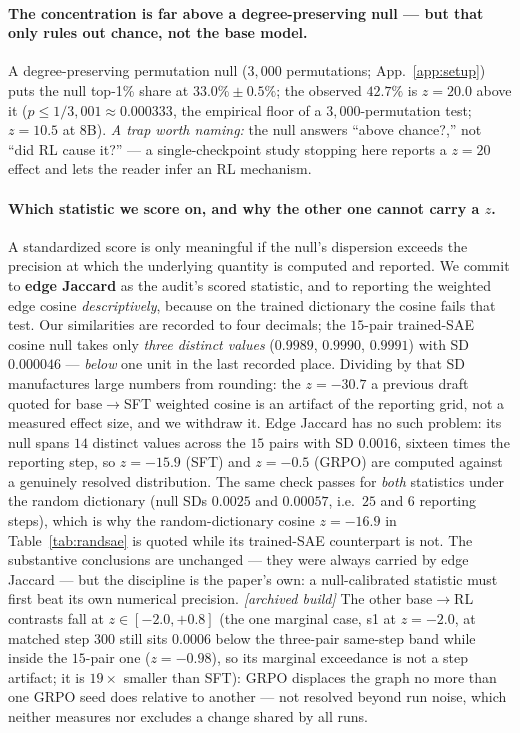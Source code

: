 \documentclass{article}
\begin{document}
\paragraph{The concentration is far above a degree-preserving null --- but that only rules out chance, not the base model.} A degree-preserving permutation null ($3{,}000$ permutations; App.~\ref{app:setup}) puts the null top-1\% share at $33.0\%\pm0.5\%$; the observed $42.7\%$ is $z=20.0$ above it ($p\le1/3{,}001\approx0.000333$, the empirical floor of a $3{,}000$-permutation test; $z=10.5$ at 8B). \emph{A trap worth naming:} the null answers ``above chance?,'' not ``did RL cause it?'' --- a single-checkpoint study stopping here reports a $z=20$ effect and lets the reader infer an RL mechanism.

\paragraph{Which statistic we score on, and why the other one cannot carry a $z$.} A standardized score is only meaningful if the null's dispersion exceeds the precision at which the underlying quantity is computed and reported. We commit to \textbf{edge Jaccard} as the audit's scored statistic, and to reporting the weighted edge cosine \emph{descriptively}, because on the trained dictionary the cosine fails that test. Our similarities are recorded to four decimals; the $15$-pair trained-SAE cosine null takes only \emph{three distinct values} ($0.9989$, $0.9990$, $0.9991$) with SD $0.000046$ --- \emph{below} one unit in the last recorded place. Dividing by that SD manufactures large numbers from rounding: the $z=-30.7$ a previous draft quoted for base$\to$SFT weighted cosine is an artifact of the reporting grid, not a measured effect size, and we withdraw it. Edge Jaccard has no such problem: its null spans $14$ distinct values across the $15$ pairs with SD $0.0016$, sixteen times the reporting step, so $z=-15.9$ (SFT) and $z=-0.5$ (GRPO) are computed against a genuinely resolved distribution. The same check passes for \emph{both} statistics under the random dictionary (null SDs $0.0025$ and $0.00057$, i.e.\ $25$ and $6$ reporting steps), which is why the random-dictionary cosine $z=-16.9$ in Table~\ref{tab:randsae} is quoted while its trained-SAE counterpart is not. The substantive conclusions are unchanged --- they were always carried by edge Jaccard --- but the discipline is the paper's own: a null-calibrated statistic must first beat its own numerical precision. \emph{[archived build]} The other base$\to$RL contrasts fall at $z\in[-2.0,+0.8]$ (the one marginal case, s1 at $z=-2.0$, at matched step $300$ still sits $0.0006$ below the three-pair same-step band while inside the $15$-pair one ($z=-0.98$), so its marginal exceedance is not a step artifact; it is $19\times$ smaller than SFT): GRPO displaces the graph no more than one GRPO seed does relative to another --- not resolved beyond run noise, which neither measures nor excludes a change shared by all runs.
\end{document}
